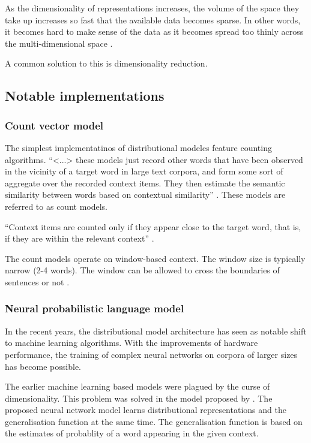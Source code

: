 \documentclass[14pt, a4paper]{extreport}
\begin{document}
As the dimensionality of representations increases, the volume of the space they take up increases so fast that the available data becomes sparse. In other words, it becomes hard to make sense of the data as it becomes spread too thinly across the multi-dimensional space \parencite{venkat}.

A common solution to this is dimensionality reduction.


\subsection{Notable implementations}

\subsubsection{Count vector model}
The simplest implementatinos of distributional modeles feature counting algorithms. ``<...> these models just record other words that have been observed in the vicinity of a target word in large text corpora, and form some sort of aggregate over the recorded context items. They then estimate the semantic similarity between words based on contextual similarity'' \parencite{erkkatrin2}. These models are referred to as count models.

``Context items are counted only if they appear close to the target word, that is, if they are within the relevant context'' \parencite{erkkatrin2}.

The count models operate on window-based context. The window size is typically narrow (2-4 words). The window can be allowed to cross the boundaries of sentences or not \parencite{baroni}.

\subsubsection{Neural probabilistic language model}
In the recent years, the distributional model architecture has seen as notable shift to machine learning algorithms. With the improvements of hardware performance, the training of complex neural networks on corpora of larger sizes has become possible. 

The earlier machine learning based models were plagued by the curse of dimensionality. This problem was solved in the model proposed by \parencite{bengio}. The proposed neural network model learns distributional representations and the generalisation function at the same time. The generalisation function is based on the estimates of probablity of a word appearing in the given context.
\end{document}
